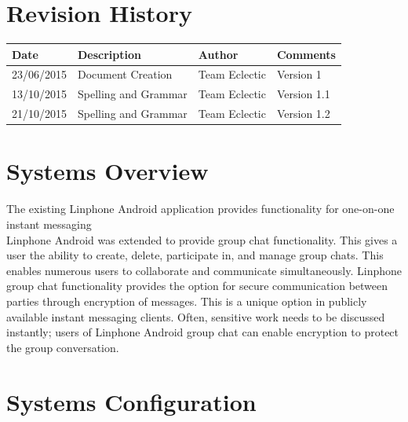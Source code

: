 \documentclass[11pt]{article}
\begin{document}


\setcounter{tocdepth}{3}
\setcounter{secnumdepth}{5}
\tableofcontents

\newpage
\section{Revision History}
\begin{table}[h]
	\begin{tabular}{llll}
		\textbf{Date}          & \textbf{Description}  & \textbf{Author}       & \textbf{Comments}   \\ \hline
		\multicolumn{1}{|R{2cm}|}{23/06/2015} & \multicolumn{1}{L{4.5cm}|}{Document Creation} & \multicolumn{1}{l|}{Team Eclectic} & \multicolumn{1}{L{4cm}|}{Version 1} \\ \hline
		\multicolumn{1}{|R{2cm}|}{13/10/2015} & \multicolumn{1}{L{4.5cm}|}{Spelling and Grammar} & \multicolumn{1}{l|}{Team Eclectic} & \multicolumn{1}{L{4cm}|}{Version 1.1} \\ \hline
		\multicolumn{1}{|R{2cm}|}{21/10/2015} & \multicolumn{1}{L{4.5cm}|}{Spelling and Grammar} & \multicolumn{1}{l|}{Team Eclectic} & \multicolumn{1}{L{4cm}|}{Version 1.2} \\ \hline
		
	\end{tabular}
\end{table}

\newpage
\section{Systems Overview}
The existing Linphone Android application provides functionality for one-on-one instant messaging \\
Linphone Android was extended to provide group chat functionality. This gives a user the ability to create, delete, participate in, and manage group chats. This enables numerous users to collaborate and communicate simultaneously. Linphone group chat functionality provides the option for secure communication between parties through encryption of messages. This is a unique option in publicly available instant messaging clients. Often, sensitive work needs to be discussed instantly; users of Linphone Android group chat can enable encryption to protect the group conversation.

\section{Systems Configuration}
\end{document}
